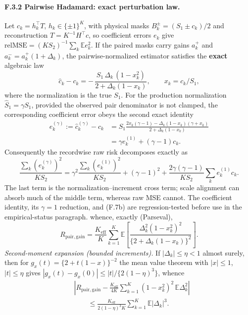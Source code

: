 \paragraph{F.3.2 Pairwise Hadamard: exact perturbation law.} Let $c_k=h_k^\top T$, $h_k\in\{\pm1\}^K$, with physical masks $B_k^\pm=(S_1\pm c_k)/2$ and reconstruction $T=K^{-1}H^\top c$, so coefficient errors $e_k$ give $\mathrm{relMSE}=(KS_2)^{-1}\sum_k\mathbb{E}e_k^2$. If the paired masks carry gains $a_k^+$ and $a_k^-=a_k^+(1+\Delta_k)$, the pairwise-normalized estimator satisfies the \textbf{exact} algebraic law
\begin{equation}
\hat c_k-c_k=-\,\frac{S_1\,\Delta_k\,(1-x_k^2)}{2+\Delta_k(1-x_k)},\qquad x_k=c_k/S_1, \tag{F.7}
\end{equation}
where the normalization is the true $S_1$. For the production normalization $\widehat S_1=\gamma S_1$, provided the observed pair denominator is not clamped, the corresponding coefficient error obeys the second exact identity
\begin{equation}
\begin{aligned}
e_k^{(\gamma)}:=\hat c_k^{(\gamma)}-c_k
&=S_1\frac{2x_k(\gamma-1)-\Delta_k(1-x_k)(\gamma+x_k)}{2+\Delta_k(1-x_k)}\\
&=\gamma e_k^{(1)}+(\gamma-1)c_k .
\end{aligned}
\tag{F.7a}
\end{equation}
Consequently the recordwise raw risk decomposes exactly as
\begin{equation}
\frac{\sum_k(e_k^{(\gamma)})^2}{KS_2}
=\gamma^2\frac{\sum_k(e_k^{(1)})^2}{KS_2}
+(\gamma-1)^2
+\frac{2\gamma(\gamma-1)}{KS_2}\sum_ke_k^{(1)}c_k .
\tag{F.7b}
\end{equation}
The last term is the normalization--increment cross term; scale alignment can absorb much of the middle term, whereas raw MSE cannot. The coefficient identity, its $\gamma=1$ reduction, and (F.7b) are regression-tested before use in the empirical-status paragraph.
whence, exactly (Parseval),
\begin{equation}
R_{\mathrm{pair,gain}}
=\frac{K_{\mathrm{eff}}}{K}\sum_{k=1}^K
\mathbb{E}\!\left[\frac{\Delta_k^2(1-x_k^2)^2}{\{2+\Delta_k(1-x_k)\}^2}\right].
\tag{F.8a}
\end{equation}
\emph{Second-moment expansion (bounded increments).} If $|\Delta_k|\le\eta<1$ almost surely, then for $g_x(t)=\{2+t(1-x)\}^{-2}$ the mean value theorem with $|x|\le1$, $|t|\le\eta$ gives $|g_x(t)-g_x(0)|\le|t|/\{2(1-\eta)^3\}$, whence
\begin{equation}
\begin{aligned}
&\left|R_{\mathrm{pair,gain}}
-\frac{K_{\mathrm{eff}}}{4K}\sum_{k=1}^K(1-x_k^2)^2\,\mathbb{E}\Delta_k^2\right|\\
&\qquad\le\frac{K_{\mathrm{eff}}}{2(1-\eta)^3K}\sum_{k=1}^K\mathbb{E}|\Delta_k|^3 .
\end{aligned}
\tag{F.8b}
\end{equation}
